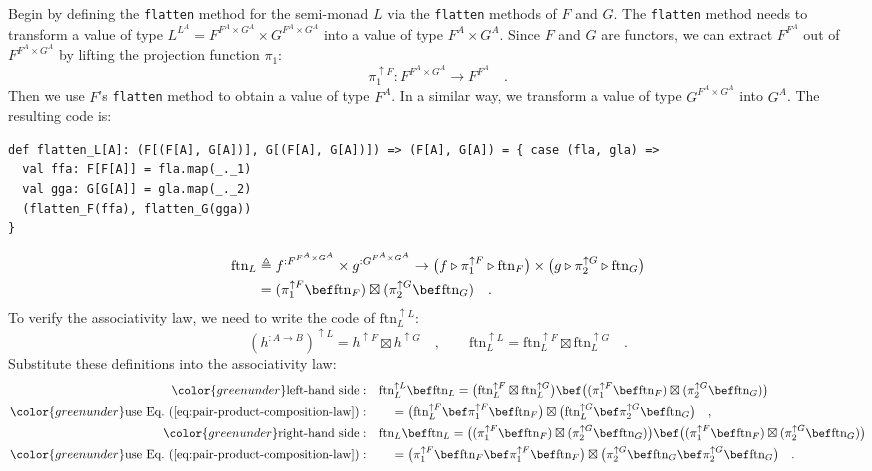 Begin by defining the \lstinline!flatten! method for the semi-monad
$L$ via the \lstinline!flatten! methods of $F$ and $G$. The \lstinline!flatten!
method needs to transform a value of type $L^{L^{A}}=F^{F^{A}\times G^{A}}\times G^{F^{A}\times G^{A}}$
into a value of type $F^{A}\times G^{A}$. Since $F$ and $G$ are
functors, we can extract $F^{F^{A}}$ out of $F^{F^{A}\times G^{A}}$
by lifting the projection function $\pi_{1}$:
\[
\pi_{1}^{\uparrow F}:F^{F^{A}\times G^{A}}\rightarrow F^{F^{A}}\quad.
\]
Then we use $F$\textsf{'}s \lstinline!flatten! method to obtain a value of
type $F^{A}$. In a similar way, we transform a value of type $G^{F^{A}\times G^{A}}$
into $G^{A}$. The resulting code is:
\begin{lstlisting}
def flatten_L[A]: (F[(F[A], G[A])], G[(F[A], G[A])]) => (F[A], G[A]) = { case (fla, gla) =>
  val ffa: F[F[A]] = fla.map(_._1)
  val gga: G[G[A]] = gla.map(_._2)
  (flatten_F(ffa), flatten_G(gga))
}
\end{lstlisting}
\begin{align}
\text{ftn}_{L} & \triangleq f^{:F^{F^{A}\times G^{A}}}\times g^{:G^{F^{A}\times G^{A}}}\rightarrow\big(f\triangleright\pi_{1}^{\uparrow F}\triangleright\text{ftn}_{F}\big)\times\big(g\triangleright\pi_{2}^{\uparrow G}\triangleright\text{ftn}_{G}\big)\nonumber \\
 & =(\pi_{1}^{\uparrow F}\bef\text{ftn}_{F})\boxtimes(\pi_{2}^{\uparrow G}\bef\text{ftn}_{G})\quad.\label{eq:monad-product-flatten-def-ftn}
\end{align}
To verify the associativity law, we need to write the code of $\text{ftn}_{L}^{\uparrow L}$:
\[
(h^{:A\rightarrow B})^{\uparrow L}=h^{\uparrow F}\boxtimes h^{\uparrow G}\quad,\quad\quad\text{ftn}_{L}^{\uparrow L}=\text{ftn}_{L}^{\uparrow F}\boxtimes\text{ftn}_{L}^{\uparrow G}\quad.
\]
Substitute these definitions into the associativity law:
\begin{align*}
{\color{greenunder}\text{left-hand side}:}\quad & \text{ftn}_{L}^{\uparrow L}\bef\text{ftn}_{L}=\big(\text{ftn}_{L}^{\uparrow F}\boxtimes\text{ftn}_{L}^{\uparrow G}\big)\bef\big((\pi_{1}^{\uparrow F}\bef\text{ftn}_{F})\boxtimes(\pi_{2}^{\uparrow G}\bef\text{ftn}_{G})\big)\\
{\color{greenunder}\text{use Eq.~(\ref{eq:pair-product-composition-law})}:}\quad & \quad=\big(\text{ftn}_{L}^{\uparrow F}\bef\pi_{1}^{\uparrow F}\bef\text{ftn}_{F}\big)\boxtimes\big(\text{ftn}_{L}^{\uparrow G}\bef\pi_{2}^{\uparrow G}\bef\text{ftn}_{G}\big)\quad,\\
{\color{greenunder}\text{right-hand side}:}\quad & \text{ftn}_{L}\bef\text{ftn}_{L}=\big((\pi_{1}^{\uparrow F}\bef\text{ftn}_{F})\boxtimes(\pi_{2}^{\uparrow G}\bef\text{ftn}_{G})\big)\bef\big((\pi_{1}^{\uparrow F}\bef\text{ftn}_{F})\boxtimes(\pi_{2}^{\uparrow G}\bef\text{ftn}_{G})\big)\\
{\color{greenunder}\text{use Eq.~(\ref{eq:pair-product-composition-law})}:}\quad & \quad=\big(\pi_{1}^{\uparrow F}\bef\text{ftn}_{F}\bef\pi_{1}^{\uparrow F}\bef\text{ftn}_{F}\big)\boxtimes\big(\pi_{2}^{\uparrow G}\bef\text{ftn}_{G}\bef\pi_{2}^{\uparrow G}\bef\text{ftn}_{G}\big)\quad.
\end{align*}
